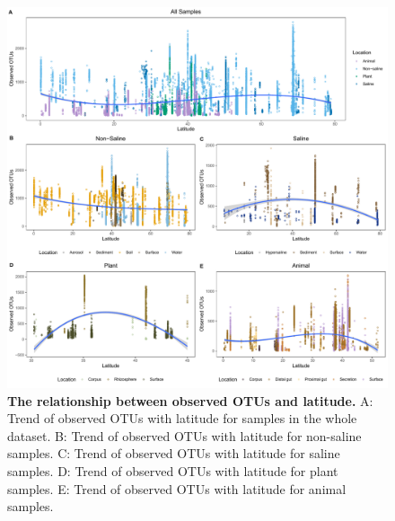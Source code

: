 \begin{figure}[H]
    \centering
    \includegraphics[scale=0.33]{./Figures/OO_lati_empo2}
    \caption{\textbf{The relationship between observed OTUs and latitude.} A: Trend of observed OTUs with latitude for samples in the whole dataset. B: Trend of observed OTUs with latitude for non-saline samples. C: Trend of observed OTUs with latitude for saline samples. D: Trend of observed OTUs with latitude for plant samples. E: Trend of observed OTUs with latitude for animal samples.}
    \label{fig:OO_lati}
\end{figure}

